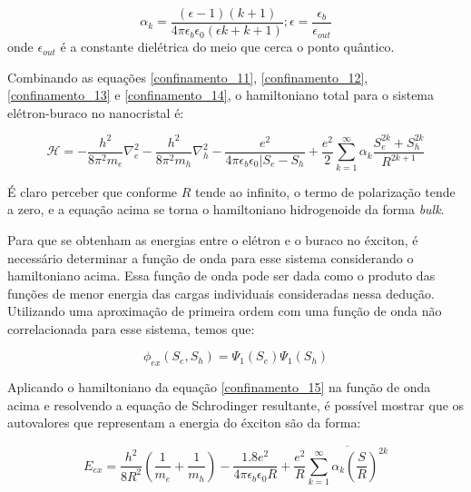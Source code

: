\begin{equation}
	\label{confinamento_14}
	\alpha_{k} = \frac{(\epsilon-1)(k+1)}{4\pi \epsilon_{b} \epsilon_{0}(\epsilon k + k + 1)}; \epsilon = \frac{\epsilon_{b}}{\epsilon_{out}}
\end{equation}
onde $\epsilon_{out}$ é a constante dielétrica do meio que cerca o ponto quântico.

\par Combinando as equações \eqref{confinamento_11}, \eqref{confinamento_12}, \eqref{confinamento_13} e \eqref{confinamento_14}, o hamiltoniano total para o sistema elétron-buraco no nanocristal é:

\begin{equation}
	\label{confinamento_15}
	\mathcal{H} = - \frac{h^2}{8\pi^2 m_{e}}\nabla_{e}^2 - \frac{h^2}{8\pi^2m_{h}}\nabla_{h}^2 - \frac{e^2}{4\pi \epsilon_{b}\epsilon_{0}|S_{e} - S_{h}} + \frac{e^2}{2} \sum_{k=1}^\infty \alpha_{k} \frac{S_{e}^{2k} + S_{h}^{2k}}{R^{2k+1}}
\end{equation}

\par É claro perceber que conforme $R$ tende ao infinito, o termo de polarização tende a zero, e a equação acima se torna o hamiltoniano hidrogenoide da forma \textit{bulk}. 

\par Para que se obtenham as energias entre o elétron e o buraco no éxciton, é necessário determinar a função de onda para esse sistema considerando o hamiltoniano acima. Essa função de onda pode ser dada como o produto das funções de menor energia das cargas individuais consideradas nessa dedução. Utilizando uma aproximação de primeira ordem com uma função de onda não correlacionada para esse sistema, temos que:

\begin{equation}
	\label{confinamento_16}
	\phi_{ex}(S_{e}, S_{h}) = \Psi_{1}(S_{e})\Psi_{1}(S_{h})
\end{equation}

\par Aplicando o hamiltoniano da equação \eqref{confinamento_15} na função de onda acima e resolvendo a equação de Schrodinger resultante, é possível mostrar que os autovalores que representam a energia do éxciton são da forma:

\begin{equation}
	\label{confinamento_17}
	E_{ex} = \frac{h^2}{8R^2}\left(\frac{1}{m_{e}} + \frac{1}{m_{h}} \right) - \frac{1.8e^2}{4\pi\epsilon_{b}\epsilon_{0}R} + \frac{e^2}{R} \overline{\sum_{k=1}^{\infty} \alpha_{k} \left(\frac{S}{R} \right)^{2k}}
\end{equation}

